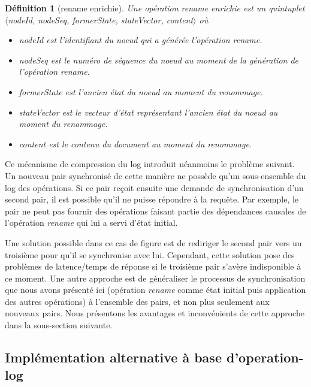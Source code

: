 \documentclass[12pt]{thesul}
\newtheorem{definition}{Définition}
\begin{document}
\begin{definition}[rename enrichie]
  \label{def:-rich-rename-op}
  Une opération \emph{rename enrichie} est un quintuplet $\langle$nodeId, nodeSeq, formerState, stateVector, content$\rangle$ où
  \begin{itemize}
    \item nodeId est l'identifiant du noeud qui a générée l'opération \emph{rename}.
    \item nodeSeq est le numéro de séquence du noeud au moment de la génération de l'opération \emph{rename}.
    \item formerState est l'ancien état du noeud au moment du renommage.
    \item stateVector est le vecteur d'état représentant l'ancien état du noeud au moment du renommage.
    \item content est le contenu du document au moment du renommage.
  \end{itemize}
\end{definition}

Ce mécanisme de compression du log introduit néanmoins le problème suivant.
Un nouveau pair synchronisé de cette manière ne possède qu'un sous-ensemble du log des opérations.
Si ce pair reçoit ensuite une demande de synchronisation d'un second pair, il est possible qu'il ne puisse répondre à la requête.
Par exemple, le pair ne peut pas fournir des opérations faisant partie des dépendances causales de l'opération \emph{rename} qui lui a servi d'état initial.

Une solution possible dans ce cas de figure est de rediriger le second pair vers un troisième pour qu'il se synchronise avec lui.
Cependant, cette solution pose des problèmes de latence/temps de réponse si le troisième pair s'avère indisponible à ce moment.
Une autre approche est de généraliser le processus de synchronisation que nous avons présenté ici (opération \emph{rename} comme état initial puis application des autres opérations) à l'ensemble des pairs, et non plus seulement aux nouveaux pairs.
Nous présentons les avantages et inconvénients de cette approche dans la sous-section suivante.


\subsection{Implémentation alternative à base d'operation-log}
\end{document}
